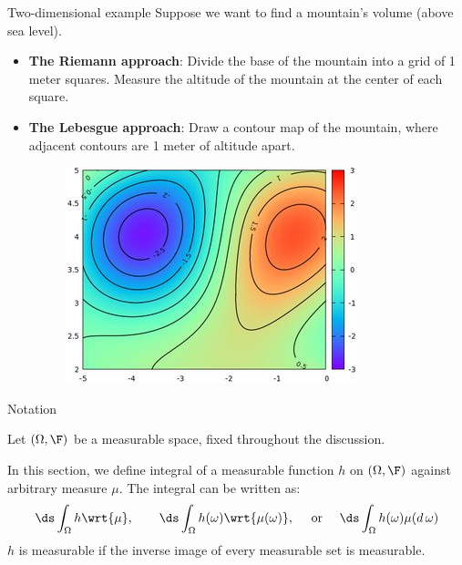 \documentclass[10pt]{beamer}
\begin{document}
\begin{frame}{Two-dimensional example}
Suppose we want to find a mountain's volume (above sea level).

\begin{itemize}
\item \textbf{The Riemann approach}: Divide the base of the mountain into a grid of 1 meter squares. Measure the altitude of the mountain at the center of each square. 
\item \textbf{The Lebesgue approach}: Draw a contour map of the mountain, where adjacent contours are 1 meter of altitude apart. 

\begin{figure}[H]
\centering 
\includegraphics[width=.4\textwidth]{images/contour_plot}
\end{figure}
\end{itemize}
\end{frame}


\begin{frame}{Notation}

Let $(\Omega, \F)$ be a measurable space, fixed throughout the discussion.

In this section, we define integral of a measurable function $h$ on $(\Omega, \F)$ against arbitrary measure $\mu$.  The integral can be written as:
\[ \ds\int_{\Omega} h \wrt{\mu}, \quad \quad \ds\int_{\Omega} h(\omega) \wrt{\mu(\omega)}, \quad \text{ or } \quad \ds\int_{\Omega} h(\omega) \mu(d \, \omega) \]
\vfill
{\tiny $h$ is measurable if the inverse image of every measurable set is measurable.}
\end{frame}
 
 
\end{document}
